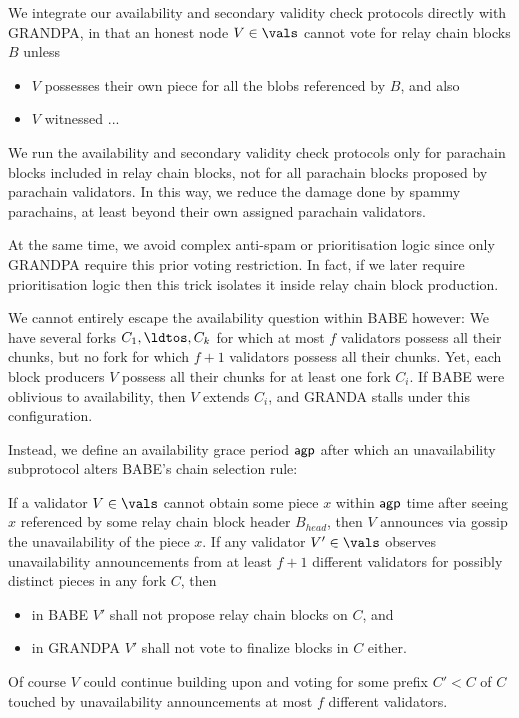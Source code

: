 We integrate our availability and secondary validity check protocols directly with GRANDPA, in that an honest node $V \in \vals$ cannot vote for relay chain blocks $B$ unless
\begin{itemize}
\item $V$ possesses their own piece for all the blobs referenced by $B$, and also
\item $V$ witnessed ... 
\end{itemize}

We run the availability and secondary validity check protocols only for parachain blocks included in relay chain blocks, not for all parachain blocks proposed by parachain validators.  In this way, we reduce the damage done by spammy parachains, at least beyond their own assigned parachain validators.

At the same time, we avoid complex anti-spam or prioritisation logic since only GRANDPA require this prior voting restriction.  In fact, if we later require prioritisation logic then this trick isolates it inside relay chain block production.

We cannot entirely escape the availability question within BABE however:  We have several forks $C_1,\ldtos,C_k$ for which at most $f$ validators possess all their chunks, but no fork for which $f+1$ validators possess all their chunks.  Yet, each block producers $V$ possess all their chunks for at least one fork $C_i$.  If BABE were oblivious to availability, then $V$ extends $C_i$, and GRANDA stalls under this configuration. 

Instead, we define an availability grace period $\mathsf{agp}$ after which an unavailability subprotocol alters BABE's chain selection rule:  

If a validator $V \in \vals$ cannot obtain some piece $x$ within $\mathsf{agp}$ time after seeing $x$ referenced by some relay chain block header $B_{head}$, then $V$ announces via gossip the unavailability of the piece $x$.  
If any validator $V' \in \vals$ observes unavailability announcements from at least $f+1$ different validators for possibly distinct pieces in any fork $C$, then
\begin{itemize}
\item in BABE $V'$ shall not propose relay chain blocks on $C$, and
\item in GRANDPA $V'$ shall not vote to finalize blocks in $C$ either.
\end{itemize}
Of course $V$ could continue building upon and voting for some prefix $C' < C$ of $C$ touched by unavailability announcements at most $f$ different validators.

